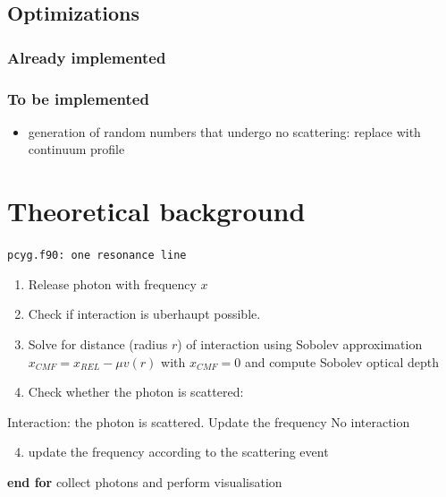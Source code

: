 \documentclass[../main/main.tex]{subfiles}
\begin{document}
\newpage
\subsection{Optimizations}

\subsubsection{Already implemented}

\subsubsection{To be implemented}

\begin{itemize}
\item generation of random numbers that undergo no scattering: replace with continuum profile
\end{itemize}

\newpage

\section{Theoretical background}
\label{theoretical_background}

\begin{center}
\vspace{-0.45cm}
\begin{algorithm}[!htp]
\caption{\texttt{pcyg.f90: one resonance line}}
\label{pcyg_one_line}
\begin{algorithmic}

\begin{enumerate}
\item Release photon with frequency $x$
\item Check if interaction is uberhaupt possible.
\item Solve for distance (radius $r$) of interaction using Sobolev approximation $x_{CMF} = x_{REL} - \mu v(r)$ with $\boxed{x_{CMF} = 0}$ and compute Sobolev optical depth
\item Check whether the photon is scattered:
\end{enumerate}
\State Interaction: the photon is scattered. Update the frequency
\Else \State No interaction
\EndIf

\begin{enumerate}
\setcounter{enumi}{3}
\item update the frequency according to the scattering event
\end{enumerate}
	
\EndFor
\State \textbf{end for}
\State collect photons and perform visualisation

\end{algorithmic}
\end{algorithm}
\end{center}
\end{document}
